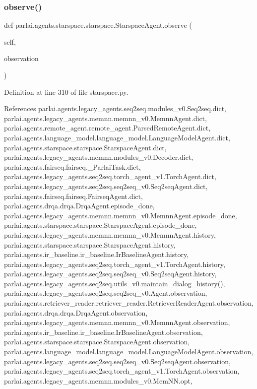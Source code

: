 \subsubsection{\texorpdfstring{observe()}{observe()}}
{\footnotesize\ttfamily def parlai.\+agents.\+starspace.\+starspace.\+Starspace\+Agent.\+observe (\begin{DoxyParamCaption}\item[{}]{self,  }\item[{}]{observation }\end{DoxyParamCaption})}



Definition at line 310 of file starspace.\+py.



References parlai.\+agents.\+legacy\+\_\+agents.\+seq2seq.\+modules\+\_\+v0.\+Seq2seq.\+dict, parlai.\+agents.\+legacy\+\_\+agents.\+memnn.\+memnn\+\_\+v0.\+Memnn\+Agent.\+dict, parlai.\+agents.\+remote\+\_\+agent.\+remote\+\_\+agent.\+Parsed\+Remote\+Agent.\+dict, parlai.\+agents.\+language\+\_\+model.\+language\+\_\+model.\+Language\+Model\+Agent.\+dict, parlai.\+agents.\+starspace.\+starspace.\+Starspace\+Agent.\+dict, parlai.\+agents.\+legacy\+\_\+agents.\+memnn.\+modules\+\_\+v0.\+Decoder.\+dict, parlai.\+agents.\+fairseq.\+fairseq.\+\_\+\+Parlai\+Task.\+dict, parlai.\+agents.\+legacy\+\_\+agents.\+seq2seq.\+torch\+\_\+agent\+\_\+v1.\+Torch\+Agent.\+dict, parlai.\+agents.\+legacy\+\_\+agents.\+seq2seq.\+seq2seq\+\_\+v0.\+Seq2seq\+Agent.\+dict, parlai.\+agents.\+fairseq.\+fairseq.\+Fairseq\+Agent.\+dict, parlai.\+agents.\+drqa.\+drqa.\+Drqa\+Agent.\+episode\+\_\+done, parlai.\+agents.\+legacy\+\_\+agents.\+memnn.\+memnn\+\_\+v0.\+Memnn\+Agent.\+episode\+\_\+done, parlai.\+agents.\+starspace.\+starspace.\+Starspace\+Agent.\+episode\+\_\+done, parlai.\+agents.\+legacy\+\_\+agents.\+memnn.\+memnn\+\_\+v0.\+Memnn\+Agent.\+history, parlai.\+agents.\+starspace.\+starspace.\+Starspace\+Agent.\+history, parlai.\+agents.\+ir\+\_\+baseline.\+ir\+\_\+baseline.\+Ir\+Baseline\+Agent.\+history, parlai.\+agents.\+legacy\+\_\+agents.\+seq2seq.\+torch\+\_\+agent\+\_\+v1.\+Torch\+Agent.\+history, parlai.\+agents.\+legacy\+\_\+agents.\+seq2seq.\+seq2seq\+\_\+v0.\+Seq2seq\+Agent.\+history, parlai.\+agents.\+legacy\+\_\+agents.\+seq2seq.\+utils\+\_\+v0.\+maintain\+\_\+dialog\+\_\+history(), parlai.\+agents.\+legacy\+\_\+agents.\+seq2seq.\+seq2seq\+\_\+v0.\+Agent.\+observation, parlai.\+agents.\+retriever\+\_\+reader.\+retriever\+\_\+reader.\+Retriever\+Reader\+Agent.\+observation, parlai.\+agents.\+drqa.\+drqa.\+Drqa\+Agent.\+observation, parlai.\+agents.\+legacy\+\_\+agents.\+memnn.\+memnn\+\_\+v0.\+Memnn\+Agent.\+observation, parlai.\+agents.\+ir\+\_\+baseline.\+ir\+\_\+baseline.\+Ir\+Baseline\+Agent.\+observation, parlai.\+agents.\+starspace.\+starspace.\+Starspace\+Agent.\+observation, parlai.\+agents.\+language\+\_\+model.\+language\+\_\+model.\+Language\+Model\+Agent.\+observation, parlai.\+agents.\+legacy\+\_\+agents.\+seq2seq.\+seq2seq\+\_\+v0.\+Seq2seq\+Agent.\+observation, parlai.\+agents.\+legacy\+\_\+agents.\+seq2seq.\+torch\+\_\+agent\+\_\+v1.\+Torch\+Agent.\+observation, parlai.\+agents.\+legacy\+\_\+agents.\+memnn.\+modules\+\_\+v0.\+Mem\+N\+N.\+opt, 